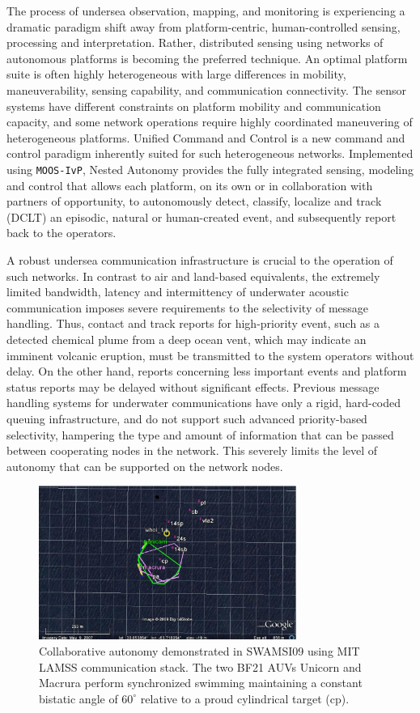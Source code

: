 \documentclass[11pt, letterpaper, oneside]{memoir}
\begin{document}
The process of undersea observation, mapping, and monitoring is experiencing a dramatic
paradigm shift away from platform-centric, human-controlled sensing,
processing and interpretation. Rather, distributed sensing
using networks of autonomous platforms is becoming the preferred technique.
An optimal platform suite is often highly heterogeneous with large differences in mobility,
maneuverability, sensing capability, and communication connectivity.  The
sensor systems have different constraints on platform mobility and
communication capacity, and some network operations require highly
coordinated maneuvering of heterogeneous platforms. Unified Command and Control \cite{unified_c2} is a new command and control paradigm inherently suited for such heterogeneous networks. Implemented using
\verb|MOOS-IvP|, Nested Autonomy provides the fully integrated sensing,
modeling and control that allows each platform, on its own or in
collaboration with partners of opportunity, to autonomously detect,
classify, localize and track (DCLT) an episodic, natural or human-created event, and
subsequently report back to the operators.

A robust undersea communication infrastructure is crucial to the
operation of such networks. In contrast to air and land-based
equivalents, the extremely limited bandwidth, latency and
intermittency of underwater acoustic communication imposes severe
requirements to the selectivity of message handling. Thus, contact and
track reports for high-priority event, such as a detected chemical
plume from a deep ocean vent,  which may indicate an imminent volcanic
eruption, must be transmitted to the system operators without delay. On the
other hand, reports concerning less important events and platform status 
reports may be delayed without significant effects.
Previous message handling systems for underwater communications have only a
rigid, hard-coded queuing infrastructure, and do not support such
advanced priority-based selectivity, hampering the type and
amount of information that can be passed between cooperating nodes in
the network. This severely limits the level of autonomy that can be
supported on the network nodes.

\begin{figure}[tp]
  \centering 
  \includegraphics[width=0.75\textwidth]{bistatic3.eps}
\caption{ Collaborative autonomy demonstrated in SWAMSI09 using MIT
  LAMSS communication stack. The two BF21 AUVs Unicorn and Macrura
  perform synchronized swimming maintaining a constant bistatic angle
  of $60^{\circ}$ relative to a proud cylindrical target
  (cp). \label{bistatic3}}
\end{figure}
\end{document}
